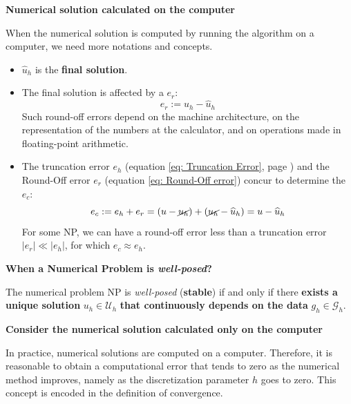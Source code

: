 \highspace
\begin{flushleft}
    \textcolor{Green3}{ \textbf{Numerical solution calculated on the computer}}
\end{flushleft}
When the numerical solution is computed by running the algorithm on a computer, we need more notations and concepts.
\begin{itemize}
    \item $\widehat{u}_{h}$ is the \textbf{final solution}.

    \item The final solution is affected by a  $e_{r}$:
    \begin{equation}\label{eq: Round-Off error}
        e_{r} := u_{h} - \widehat{u}_{h}
    \end{equation}
    Such round-off errors depend on the machine architecture, on the representation of the numbers at the calculator, and on operations made in floating-point arithmetic.

    \item The truncation error $e_{h}$ (equation \ref{eq: Truncation Error}, page \pageref{eq: Truncation Error}) and the Round-Off error $e_{r}$ (equation \ref{eq: Round-Off error}) concur to determine the  $e_{c}$:
    \begin{equation}
        e_{c} := e_{h} + e_{r} = \left(u - \cancel{u_{h}}\right) + \left(\cancel{u_{h}} - \widehat{u}_{h}\right) = u - \widehat{u}_{h}
    \end{equation}
    For some NP, we can have a round-off error less than a truncation error $\left|e_{r}\right| \ll \left|e_{h}\right|$, for which $e_{c} \approx e_{h}$.
\end{itemize}

\newpage

\begin{flushleft}
    \textcolor{Green3}{ \textbf{When a Numerical Problem is \emph{well-posed}?}}
\end{flushleft}
\begin{definitionbox}
    The numerical problem NP is \emph{well-posed} (\textbf{stable}) if and only if there \textbf{exists a unique solution} $u_{h} \in \mathcal{U}_{h}$ \textbf{that continuously depends on the data} $g_{h} \in \mathcal{G}_{h}$.
\end{definitionbox}

\highspace
\begin{flushleft}
    \textcolor{Green3}{ \textbf{Consider the numerical solution calculated only on the computer}}
\end{flushleft}
In practice, numerical solutions are computed on a computer. Therefore, it is reasonable to obtain a computational error that tends to zero as the numerical method improves, namely as the discretization parameter $h$ goes to zero. This concept is encoded in the definition of convergence.

